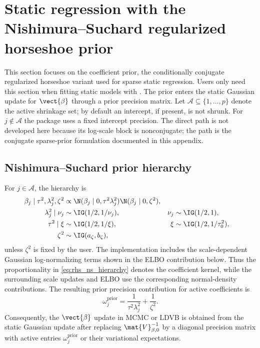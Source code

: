 \section{Static regression with the Nishimura--Suchard 
regularized horseshoe prior}
\label{sec:static_rhs}

This section focuses on the  coefficient prior, the
conditionally conjugate regularized horseshoe variant used for sparse static
regression. Users only need this section when fitting static models with
. The prior enters the static Gaussian update for
$\vect{\beta}$ through a prior precision matrix. Let
$\mathcal{A}\subseteq\{1,\ldots,p\}$ denote the active shrinkage set; by
default an intercept, if present, is not shrunk. For $j\notin\mathcal{A}$ the
package uses a fixed intercept precision. The direct  path is not
developed here because its log-scale block is nonconjugate; the
 path is the conjugate sparse-prior formulation documented in
this appendix.

\subsection{Nishimura--Suchard prior hierarchy}

For $j\in\mathcal{A}$, the  hierarchy is
\begin{align}
\beta_j\mid\tau^2,\lambda_j^2,\zeta^2
&\propto
\N(\beta_j\mid0,\tau^2\lambda_j^2)
\N(\beta_j\mid0,\zeta^2),\\
\lambda_j^2\mid\nu_j &\sim \IG(1/2,1/\nu_j),&
\nu_j&\sim\IG(1/2,1),\\
\tau^2\mid\xi &\sim\IG(1/2,1/\xi),&
\xi&\sim\IG(1/2,1/\tau_0^2),\\
\zeta^2&\sim\IG(a_\zeta,b_\zeta),
\label{eq:rhs_ns_hierarchy}
\end{align}
unless $\zeta^2$ is fixed by the user. The implementation includes the
scale-dependent Gaussian log-normalizing terms shown in the ELBO contribution
below. Thus the proportionality in \eqref{eq:rhs_ns_hierarchy} denotes the
coefficient kernel, while the surrounding scale updates and ELBO use the
corresponding normal-density contributions. The resulting prior precision
contribution for active coefficients is
\begin{equation}
\omega^{\mathrm{prior}}_j=\frac{1}{\tau^2\lambda_j^2}+\frac{1}{\zeta^2}.
\label{eq:rhs_ns_precision}
\end{equation}
Consequently, the $\vect{\beta}$ update in MCMC or LDVB is obtained from the
static Gaussian update after replacing $\mat{V}_{\beta,0}^{-1}$ by a diagonal precision
matrix with active entries $\omega^{\mathrm{prior}}_j$ or their variational
expectations.

